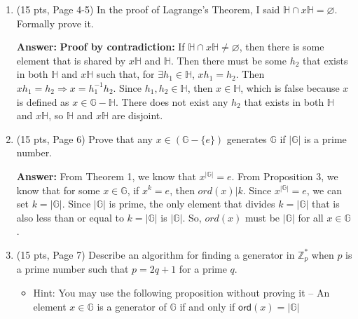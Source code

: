 \documentclass[10pt]{article}
\begin{document}
\begin{enumerate}
	\bigskip\item (15 pts, Page 4-5) In the proof of Lagrange's Theorem, I said $\mathbb{H}\cap x\mathbb{H}=\varnothing$. Formally prove it.
	
	
	
	\textbf{Answer:} \newline \textbf{Proof by contradiction:} \newline If $\mathbb{H}\cap x\mathbb{H}\ne\varnothing$, then there is some element that is shared by $x\mathbb{H}$ and $\mathbb{H}$. Then there must be some $h_2$ that exists in both $\mathbb{H}$ and $x\mathbb{H}$ such that, for $\exists h_1\in\mathbb{H}$, $xh_1=h_2$. Then $xh_1=h_2\Rightarrow x=h_1^{-1}h_2$. Since $h_1, h_2\in\mathbb{H}$, then $x\in\mathbb{H}$, which is false because $x$ is defined as $x\in\mathbb{G}-\mathbb{H}$. There does not exist any $h_2$ that exists in both $\mathbb{H}$ and $x\mathbb{H}$, so $\mathbb{H}$ and $x\mathbb{H}$ are disjoint. 
	
	\bigskip\item (15 pts, Page 6) Prove that any $x\in(\mathbb{G}-\{e\})$ generates $\mathbb{G}$ if $|\mathbb{G}|$ is a prime number.
	
	
	\textbf{Answer:} \newline From Theorem 1, we know that $x^{|\mathbb{G}|}=e$. From Proposition 3, we know that for some $x\in\mathbb{G}$, if $x^k=e$, then $ord(x)|k$. Since $x^{|\mathbb{G}|}=e$, we can set $k=|\mathbb{G}|$. Since $|\mathbb{G}|$ is prime, the only element that divides $k=|\mathbb{G}|$ that is also less than or equal to $k=|\mathbb{G}|$ is $|\mathbb{G}|$. So, $ord(x)$ must be $|\mathbb{G}|$ for all $x\in\mathbb{G}$. 
	
	\bigskip\item (15 pts, Page 7) Describe an algorithm for finding a generator in $\mathbb{Z}_p^*$ when $p$ is a prime number such that $p=2q+1$ for a prime $q$.
		\begin{itemize}
		\item Hint: You may use the following proposition without proving it -- An element $x\in\mathbb{G}$ is a generator of $\mathbb{G}$ if and only if $\mathsf{ord}({x})=|\mathbb{G}|$
	\end{itemize}
	

\end{enumerate}
\end{document}
